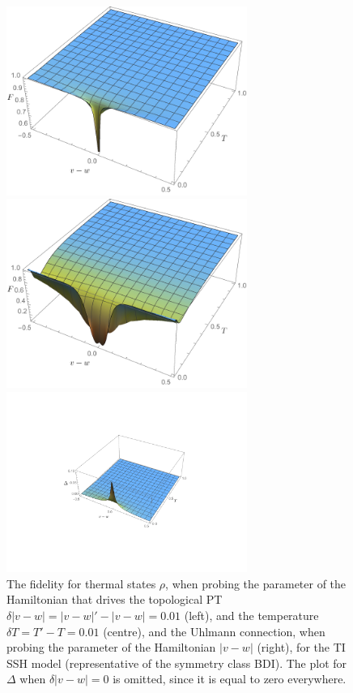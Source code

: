 \begin{figure}[h!]
\begin{minipage}{0.33\textwidth}
\includegraphics[width=0.7\textwidth,height=0.5\textwidth]{SSH_fidelity_theta.pdf}
\end{minipage}%
\begin{minipage}{0.33\textwidth}
\includegraphics[width=0.7\textwidth,height=0.5\textwidth]{SSH_fidelity_T.pdf}
\end{minipage}
\begin{minipage}{0.33\textwidth}
\includegraphics[width=0.7\textwidth,height=0.5\textwidth]{SSH_uhlmann_theta.pdf}
\end{minipage}%
\caption{The fidelity for thermal states $\rho$, when probing the parameter of the Hamiltonian that drives the topological PT $\delta |v-w| =|v-w|'-|v-w|=0.01$ (left), and the temperature $\delta T=T'-T=0.01$ (centre), and the Uhlmann connection, when probing the parameter of the Hamiltonian $|v-w|$ (right), for the TI SSH model (representative of the symmetry class BDI). The plot for $\Delta$ when $\delta |v-w|=0$ is omitted, since it is equal to zero everywhere.}
\label{fig:fid:ssh}
\end{figure}
